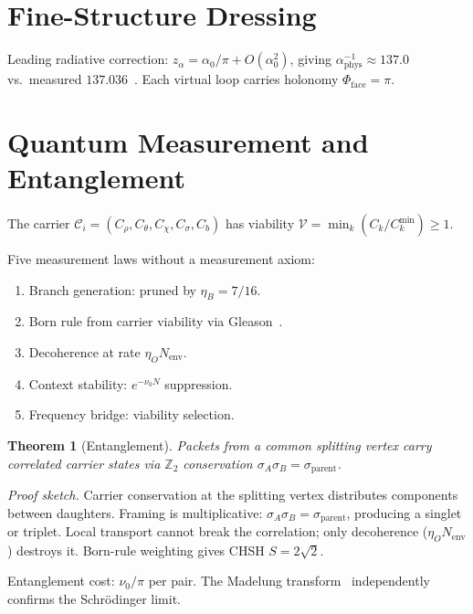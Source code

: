 \documentclass[11pt,twocolumn]{article}
\newtheorem{theorem}{Theorem}
\begin{document}
\section{Fine-Structure Dressing}
\label{sec:dressing}

Leading radiative correction:
$z_\alpha = \alpha_0/\pi + O(\alpha_0^2)$,
giving $\alpha_{\mathrm{phys}}^{-1}\approx 137.0$ vs.\ measured $137.036$~\cite{planck2018}.
Each virtual loop carries holonomy $\Phi_{\mathrm{face}}=\pi$.

\section{Quantum Measurement and Entanglement}
\label{sec:quantum}

The carrier $\mathcal{C}_i=(C_\rho,C_\theta,C_\chi,C_\sigma,C_b)$ has viability $\mathcal{V}=\min_k(C_k/C_k^{\min})\geq 1$.

Five measurement laws without a measurement axiom:
\begin{enumerate}[label=(\roman*),leftmargin=2em,itemsep=1pt]
\item Branch generation: pruned by $\eta_B=7/16$.
\item Born rule from carrier viability via Gleason~\cite{gleason1957}.
\item Decoherence at rate $\eta_O N_{\mathrm{env}}$.
\item Context stability: $e^{-\nu_0 N}$ suppression.
\item Frequency bridge: viability selection.
\end{enumerate}

\begin{theorem}[Entanglement]
\label{thm:entangle}
Packets from a common splitting vertex carry correlated carrier states via $\mathbb{Z}_2$ conservation $\sigma_A\sigma_B=\sigma_{\mathrm{parent}}$.
\end{theorem}
\textit{Proof sketch.}
Carrier conservation at the splitting vertex distributes components between daughters.
Framing is multiplicative: $\sigma_A\sigma_B=\sigma_{\mathrm{parent}}$, producing a singlet or triplet.
Local transport cannot break the correlation; only decoherence ($\eta_O N_{\mathrm{env}}$) destroys it.
Born-rule weighting gives CHSH $S=2\sqrt{2}$.

Entanglement cost: $\nu_0/\pi$ per pair.
The Madelung transform~\cite{madelung1927} independently confirms the Schr\"odinger limit.
\end{document}

